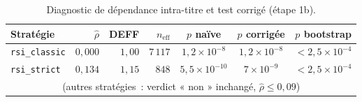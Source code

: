 \begin{table}[H]
\centering
\caption{Diagnostic de dépendance intra-titre et test corrigé (étape 1b).}
\label{tab:b1-dep-deff}
\small
\begin{tabular}{@{}lrrrccc@{}}
\toprule
Stratégie & $\hat\rho$ & DEFF & $n_{\text{eff}}$ & $p$ naïve & $p$ corrigée & $p$ bootstrap \\
\midrule
\texttt{rsi\_classic} & $0{,}000$ & $1{,}00$ & $7\,117$ & $1{,}2\times10^{-8}$ & $1{,}2\times10^{-8}$ & $<2{,}5\times10^{-4}$ \\
\texttt{rsi\_strict}  & $0{,}134$ & $1{,}15$ & $848$    & $5{,}5\times10^{-10}$ & $7\times10^{-9}$     & $<2{,}5\times10^{-4}$ \\
\multicolumn{7}{c}{\footnotesize (autres stratégies~: verdict « non » inchangé, $\hat\rho \le 0{,}09$)} \\
\bottomrule
\end{tabular}
\end{table}

